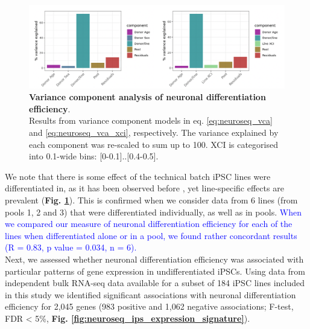 \begin{figure}[htbp]
\centering
\includegraphics[width=16cm]{Chapter5/Fig/neuroseq_diff_eff_vca.png}
\caption[Variance component analysis of neuronal differentiation efficiency]{\textbf{Variance component analysis of neuronal differentiation efficiency}.\\
Results from variance component models in eq. \eqref{eq:neuroseq_vca} and \eqref{eq:neuroseq_vca_xci}, respectively.
The variance explained by each component was re-scaled to sum up to 100.
XCI is categorised into 0.1-wide bins: [0-0.1]..[0.4-0.5].}
\label{fig:neuroseq_diff_eff_vca}
\end{figure}

\newpage

We note that there is some effect of the technical batch iPSC lines were differentiated in, as it has been observed before \cite{kilpinen2017common, schwartzentruber2018molecular}, yet line-specific effects are prevalent (\textbf{Fig. \ref{fig:neuroseq_diff_eff_vca}}).
This is confirmed when we consider data from 6 lines (from pools 1, 2 and 3) that were differentiated individually, as well as in pools.
\textcolor{blue}{When we compared our measure of neuronal differentiation efficiency for each of the lines when differentiated alone or in a pool, we found rather concordant results (R = 0.83, p value = 0.034, n = 6).}\\ 

Next, we assessed whether neuronal differentiation efficiency was associated with particular patterns of gene expression in undifferentiated iPSCs. 
Using data from independent bulk RNA-seq data available for a subset of 184 iPSC lines included in this study \cite{kilpinen2017common, bonder2019systematic} we identified significant associations with neuronal differentiation efficiency for 2,045 genes (983 positive and 1,062 negative associations; F-test, FDR < 5\%, \textbf{Fig. \ref{fig:neuroseq_ips_expression_signature}}). 


